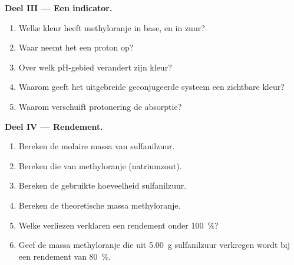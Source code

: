 \begin{problem}
\medskip
\noindent\textbf{Deel III --- Een indicator.}
\begin{enumerate}[resume]
  \item Welke kleur heeft methyloranje in base, en in zuur?
  \item Waar neemt het een proton op?
  \item Over welk pH-gebied verandert zijn kleur?
  \item Waarom geeft het uitgebreide geconjugeerde systeem een zichtbare kleur?
  \item Waarom verschuift protonering de absorptie?
\end{enumerate}

\medskip
\noindent\textbf{Deel IV --- Rendement.}
\begin{enumerate}[resume]
  \item Bereken de molaire massa van sulfanilzuur.
  \item Bereken die van methyloranje (natriumzout).
  \item Bereken de gebruikte hoeveelheid sulfanilzuur.
  \item Bereken de theoretische massa methyloranje.
  \item Welke verliezen verklaren een rendement onder 100~\%?
  \item Geef de massa methyloranje die uit \qty{5.00}{g} sulfanilzuur verkregen wordt bij een rendement
        van 80~\%.
\end{enumerate}
\end{problem}

